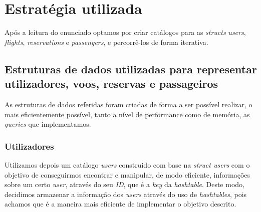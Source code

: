 \documentclass[11pt]{article}
\begin{document}
\section{Estratégia utilizada}
    Após a leitura do enunciado optamos por criar catálogos para as \textit{structs} \textit{users}, \textit{flights}, \textit{reservations} e \textit{passengers}, e percorrê-los de forma iterativa.
    \subsection{Estruturas de dados utilizadas para representar utilizadores, voos, reservas e passageiros}
    As estruturas de dados referidas foram criadas de forma a ser possível realizar, o mais eficientemente possível, tanto a nível de performance como de memória, as \textit{queries} que implementamos.
    
\subsubsection{Utilizadores}
    Utilizamos depois um catálogo \textit{users} construido com base na \textit{struct users} com o objetivo de conseguirmos encontrar e manipular, de modo eficiente, informações sobre um certo \textit{user}, através do seu \textit{ID}, que é a \textit{key} da \textit{hashtable}. Deste modo, decidimos armazenar a informação dos \textit{users} através do uso de \textit{hashtables}, pois achamos que é a maneira mais eficiente de implementar o objetivo descrito.
    
\end{document}
